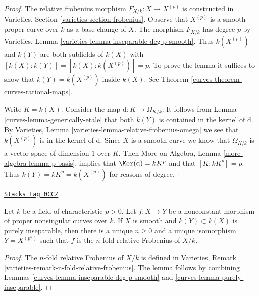 \begin{proof}

The relative frobenius morphism $F_{X/k} : X \to X^{(p)}$
is constructed in Varieties, Section \ref{varieties-section-frobenius}.
Observe that $X^{(p)}$ is a smooth proper curve over $k$
as a base change of $X$. The morphism $F_{X/k}$ has degree $p$ by
Varieties, Lemma \ref{varieties-lemma-inseparable-deg-p-smooth}.
Thus $k(X^{(p)})$ and $k(Y)$ are both subfields of $k(X)$
with $[k(X) : k(Y)] = [k(X) : k(X^{(p)})] = p$. To prove the lemma
it suffices to show that $k(Y) = k(X^{(p)})$ inside $k(X)$. See
Theorem \ref{curves-theorem-curves-rational-maps}.

\medskip\noindent
Write $K = k(X)$. Consider the map $\text{d} : K \to \Omega_{K/k}$.
It follows from Lemma \ref{curves-lemma-generically-etale}
that both $k(Y)$ is contained in the
kernel of $\text{d}$. By
Varieties, Lemma \ref{varieties-lemma-relative-frobenius-omega}
we see that $k(X^{(p)})$ is in the kernel of $\text{d}$.
Since $X$ is a smooth curve we know that $\Omega_{K/k}$
is a vector space of dimension $1$ over $K$.
Then More on Algebra, Lemma \ref{more-algebra-lemma-p-basis}.
implies that $\Ker(\text{d}) = kK^p$ and
that $[K : kK^p] = p$.
Thus $k(Y) = kK^p = k(X^{(p)})$ for reasons of degree.
\end{proof}

\begin{lemma}
\label{curves-lemma-purely-inseparable-smooth}
\href{https://stacks.math.columbia.edu/tag/0CCZ}{\texttt{Stacks tag 0CCZ}}

Let $k$ be a field of characteristic $p > 0$. Let $f : X \to Y$ be a
nonconstant morphism of proper nonsingular curves over $k$.
If $X$ is smooth and $k(Y) \subset k(X)$ is purely inseparable,
then there is a unique $n \geq 0$ and a unique isomorphism $Y = X^{(p^n)}$
such that $f$ is the $n$-fold relative Frobenius of $X/k$.
\end{lemma}

\begin{proof}

The $n$-fold relative Frobenius of $X/k$ is defined in
Varieties, Remark \ref{varieties-remark-n-fold-relative-frobenius}.
The lemma follows by combining Lemmas \ref{curves-lemma-inseparable-deg-p-smooth}
and \ref{curves-lemma-purely-inseparable}.
\end{proof}

